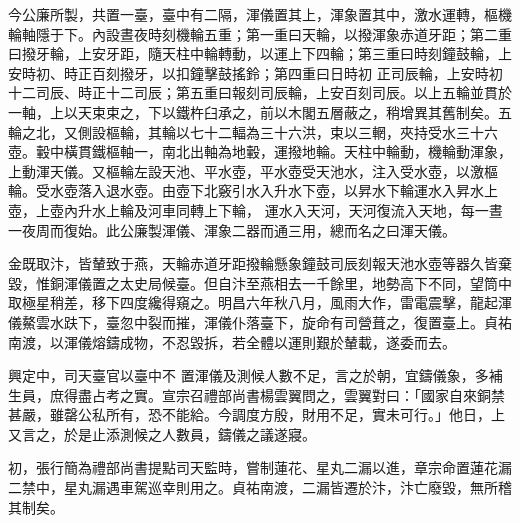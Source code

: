 \begin{pinyinscope}
 今公廉所製，共置一臺，臺中有二隔，渾儀置其上，渾象置其中，激水運轉，樞機輪軸隱于下。內設晝夜時刻機輪五重；第一重曰天輪，以撥渾象赤道牙距；第二重曰撥牙輪，上安牙距，隨天柱中輪轉動，以運上下四輪；第三重曰時刻鐘鼓輪，上安時初、時正百刻撥牙，以扣鐘擊鼓搖鈴；第四重曰日時初
 正司辰輪，上安時初十二司辰、時正十二司辰；第五重曰報刻司辰輪，上安百刻司辰。以上五輪並貫於一軸，上以天束束之，下以鐵杵臼承之，前以木閣五層蔽之，稍增異其舊制矣。五輪之北，又側設樞輪，其輪以七十二輻為三十六洪，束以三輞，夾持受水三十六壺。轂中橫貫鐵樞軸一，南北出軸為地轂，運撥地輪。天柱中輪動，機輪動渾象，上動渾天儀。又樞輪左設天池、平水壺，平水壺受天池水，注入受水壺，以激樞輪。受水壺落入退水壺。由壺下北竅引水入升水下壺，以昇水下輪運水入昇水上壺，上壺內升水上輪及河車同轉上下輪，
 運水入天河，天河復流入天地，每一晝一夜周而復始。此公廉製渾儀、渾象二器而通三用，總而名之曰渾天儀。



 金既取汴，皆輦致于燕，天輪赤道牙距撥輪懸象鐘鼓司辰刻報天池水壺等器久皆棄毀，惟銅渾儀置之太史局候臺。但自汴至燕相去一千餘里，地勢高下不同，望筒中取極星稍差，移下四度纔得窺之。明昌六年秋八月，風雨大作，雷電震擊，龍起渾儀鰲雲水趺下，臺忽中裂而摧，渾儀仆落臺下，旋命有司營葺之，復置臺上。貞祐南渡，以渾儀熔鑄成物，不忍毀拆，若全體以運則艱於輦載，遂委而去。



 興定中，司天臺官以臺中不
 置渾儀及測候人數不足，言之於朝，宜鑄儀象，多補生員，庶得盡占考之實。宣宗召禮部尚書楊雲翼問之，雲翼對曰：「國家自來銅禁甚嚴，雖罄公私所有，恐不能給。今調度方殷，財用不足，實未可行。」他日，上又言之，於是止添測候之人數員，鑄儀之議遂寢。



 初，張行簡為禮部尚書提點司天監時，嘗制蓮花、星丸二漏以進，章宗命置蓮花漏二禁中，星丸漏遇車駕巡幸則用之。貞祐南渡，二漏皆遷於汴，汴亡廢毀，無所稽其制矣。



\end{pinyinscope}